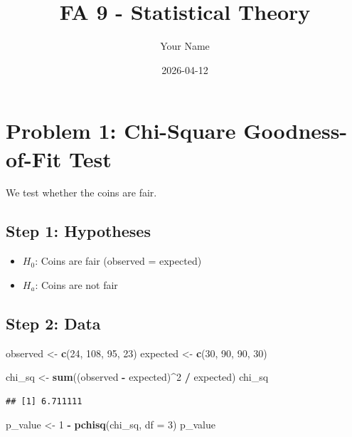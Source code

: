 \documentclass[
]{article}
\title{FA 9 - Statistical Theory}
\author{Your Name}
\date{2026-04-12}
\newenvironment{Shaded}{\begin{snugshade}}{\end{snugshade}}
\newcommand{\AttributeTok}[1]{\textcolor[rgb]{0.13,0.29,0.53}{#1}}
\newcommand{\DecValTok}[1]{\textcolor[rgb]{0.00,0.00,0.81}{#1}}
\newcommand{\FunctionTok}[1]{\textcolor[rgb]{0.13,0.29,0.53}{\textbf{#1}}}
\newcommand{\NormalTok}[1]{#1}
\newcommand{\OtherTok}[1]{\textcolor[rgb]{0.56,0.35,0.01}{#1}}
\newcommand{\SpecialCharTok}[1]{\textcolor[rgb]{0.81,0.36,0.00}{\textbf{#1}}}
\providecommand{\tightlist}{%
  \setlength{\itemsep}{0pt}\setlength{\parskip}{0pt}}
\begin{document}
\maketitle

\section{Problem 1: Chi-Square Goodness-of-Fit
Test}\label{problem-1-chi-square-goodness-of-fit-test}

We test whether the coins are fair.

\subsection{Step 1: Hypotheses}\label{step-1-hypotheses}

\begin{itemize}
\tightlist
\item
  \(H_0\): Coins are fair (observed = expected)
\item
  \(H_a\): Coins are not fair
\end{itemize}

\subsection{Step 2: Data}\label{step-2-data}

\begin{Shaded}
\begin{Highlighting}[]
\NormalTok{observed }\OtherTok{\textless{}{-}} \FunctionTok{c}\NormalTok{(}\DecValTok{24}\NormalTok{, }\DecValTok{108}\NormalTok{, }\DecValTok{95}\NormalTok{, }\DecValTok{23}\NormalTok{)}
\NormalTok{expected }\OtherTok{\textless{}{-}} \FunctionTok{c}\NormalTok{(}\DecValTok{30}\NormalTok{, }\DecValTok{90}\NormalTok{, }\DecValTok{90}\NormalTok{, }\DecValTok{30}\NormalTok{)}

\NormalTok{chi\_sq }\OtherTok{\textless{}{-}} \FunctionTok{sum}\NormalTok{((observed }\SpecialCharTok{{-}}\NormalTok{ expected)}\SpecialCharTok{\^{}}\DecValTok{2} \SpecialCharTok{/}\NormalTok{ expected)}
\NormalTok{chi\_sq}
\end{Highlighting}
\end{Shaded}

\begin{verbatim}
## [1] 6.711111
\end{verbatim}

\begin{Shaded}
\begin{Highlighting}[]
\NormalTok{p\_value }\OtherTok{\textless{}{-}} \DecValTok{1} \SpecialCharTok{{-}} \FunctionTok{pchisq}\NormalTok{(chi\_sq, }\AttributeTok{df =} \DecValTok{3}\NormalTok{)}
\NormalTok{p\_value}
\end{Highlighting}
\end{Shaded}
\end{document}
